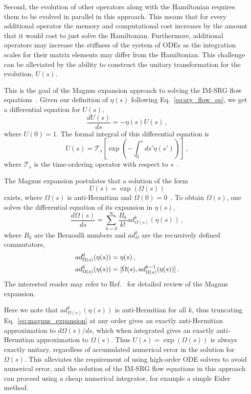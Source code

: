 Second, the evolution of other operators along with the Hamiltonian
requires them to be evolved in parallel in this approach.
This means that for every additional operator the memory and computational cost
increases by the amount that it would cost to just solve the Hamiltonian.
Furthermore, additional operators may increase the stiffness of the system of ODEs
as the integration scales for their matrix elements may differ from the Hamiltonian.
This challenge can be alleviated by the ability to construct the unitary transformation
for the evolution, $U(s)$.

This is the goal of the Magnus expansion approach to solving the IM-SRG flow equations~\cite{Morr15magnus}.
Given our definition of $\eta(s)$ following Eq.~\ref{eq:srg_flow_eq},
we get a differential equation for $U(s)$,
\begin{equation}
  \frac{dU(s)}{ds} = - \eta(s) U(s)\,,
\end{equation}
where $U(0) = 1$.
The formal integral of this differential equation is
\begin{equation}
  U(s) = \mathcal{T}_s\left[\exp(-\int_{0}^{s} ds' \eta(s'))\right]\,,
\end{equation}
where $\mathcal{T}_s$ is the time-ordering operator with respect to $s$~\cite{Dyso49timeorder}.

The Magnus expansion postulates that a solution of the form
\begin{equation}
  U(s) = \exp(\Omega(s))
\end{equation}
exists, where $\Omega(s)$ is anti-Hermitian and $\Omega(0) = 0$~\cite{Magn54magnus}.
To obtain $\Omega(s)$, one solves the differential equation of its expansion in $\eta(s)$,
\begin{equation}\label{eq:magnus_expansion}
  \frac{d \Omega(s)}{ds} = \sum_{k=0}^{\infty} \frac{B_{k}}{k!} ad^{k}_{\Omega(s)}(\eta(s))\,,
\end{equation}
where $B_{k}$ are the Bernoulli numbers
and $ad^{k}_{\Omega}$ are the recursively defined commutators,
\begin{align}
  ad^{0}_{\Omega(s)}(\eta(s)) &= \eta(s)\,, \\
  ad^{k}_{\Omega(s)}(\eta(s)) &= [\Omega(s), ad^{k-1}_{\Omega(s)}(\eta(s))]\,.
\end{align}
The interested reader may refer to Ref.~\cite{Blan09magnusreview} for detailed review
of the Magnus expansion.

Here we note that $ad^{k}_{\Omega(s)}(\eta(s))$ is anti-Hermitian for all $k$,
thus truncating Eq.~\ref{eq:magnus_expansion} at any order
gives an exactly anti-Hermitian approximation to $d\Omega(s)/ds$,
which when integrated gives an exactly anti-Hermitian approximation to $\Omega(s)$.
Thus $U(s) = \exp(\Omega(s))$ is always exactly unitary,
regardless of accumulated numerical error in the solution for $\Omega(s)$.
This alleviates the requirement of using high-order ODE solvers to avoid numerical error,
and the solution of the IM-SRG flow equations in this approach
can proceed using a cheap numerical integrator,
for example a simple Euler method.

